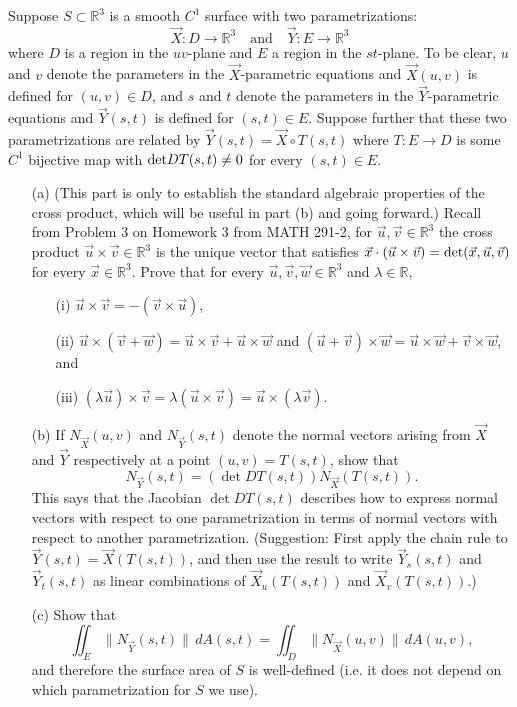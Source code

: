 \documentclass[11pt,letterpaper,cm]{nupset}
\begin{document}
\begin{problem}[Exercise 4] Suppose $S \subset \mathbb{R}^3$ is a smooth $C^1$ surface with two parametrizations:
	$$\vec{X}: D \to \mathbb{R}^3 \quad\text{and}\quad \vec{Y}: E \to \mathbb{R}^3$$
	where $D$ is a region in the $uv$-plane and $E$ a region in the $st$-plane. To be clear, $u$ and $v$ denote the parameters in the $\vec{X}$-parametric equations and $\vec{X}(u,v)$ is defined for $(u,v)\in D$, and $s$ and $t$ denote the parameters in the $\vec{Y}$-parametric equations and $\vec{Y}(s,t)$ is defined for $(s,t)\in E$. Suppose further that these two parametrizations are related by $\vec{Y}(s,t) = \vec{X} \circ T(s,t)$ where $T: E \to D$ is some $C^1$ bijective map with ${\rm det} DT(s,t)\neq 0$ for every $(s,t)\in E$.
	\begin{itemize}
		\item[(a)] (This part is only to establish the standard algebraic properties of the cross product, which will be useful in part (b) and going forward.)  Recall from Problem 3 on Homework 3 from MATH 291-2, for $\vec{u},\vec{v}\in \mathbb{R}^3$ the cross product $\vec{u}\times\vec{v}\in\mathbb{R}^3$ is the unique vector that satisfies $\vec{x}\cdot(\vec{u}\times\vec{v})={\rm det}(\vec{x},\vec{u},\vec{v})$ for every $\vec{x}\in\mathbb{R}^3$.  Prove that for every $\vec{u},\vec{v},\vec{w}\in\mathbb{R}^3$ and $\lambda\in\mathbb{R}$, 
		\begin{itemize}
			\item[(i)] $\vec{u}\times\vec{v}=-(\vec{v}\times\vec{u})$,
			\item[(ii)] $\vec{u}\times(\vec{v}+\vec{w})=\vec{u}\times\vec{v}+\vec{u}\times\vec{w}$ and $(\vec{u}+\vec{v})\times\vec{w}=\vec{u}\times\vec{w}+\vec{v}\times\vec{w}$, and
			\item[(iii)] $(\lambda \vec{u})\times \vec{v}=\lambda(\vec{u}\times\vec{v})=\vec{u}\times(\lambda\vec{v}).$
		\end{itemize}
		\item[(b)] If $N_{\vec{X}}(u,v)$ and $N_{\vec{Y}}(s,t)$ denote the normal vectors arising from $\vec{X}$ and $\vec{Y}$ respectively at a point $(u,v) = T(s,t)$, show that
		$$N_{\vec{Y}}(s,t) = (\det DT(s,t))N_{\vec{X}}(T(s,t)).$$
		This says that the Jacobian $\det DT(s,t)$ describes how to express normal vectors with respect to one parametrization in terms of normal vectors with respect to another parametrization.  (Suggestion: First apply the chain rule to $\vec{Y}(s,t)=\vec{X}(T(s,t))$, and then use the result to write $\vec{Y}_s(s,t)$ and $\vec{Y}_t(s,t)$ as linear combinations of $\vec{X}_u(T(s,t))$ and $\vec{X}_v(T(s,t))$.)
		\item[(c)] Show that
		$$\iint_E \|N_{\vec{Y}}(s,t)\|\,dA(s,t) = \iint_D \|N_{\vec{X}}(u,v)\|\,dA(u,v),$$
		and therefore the surface area of $S$ is well-defined (i.e. it does not depend on which parametrization for $S$ we use).
	\end{itemize}
\end{problem}
\end{document}
